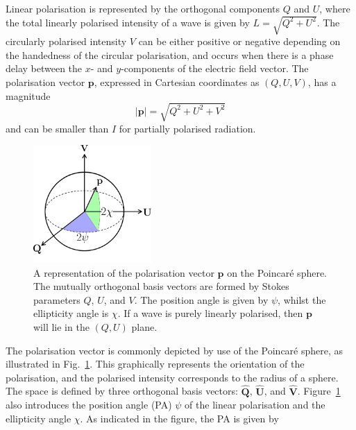 Linear polarisation is represented by the orthogonal components $Q$ and $U$, where the total linearly polarised intensity of a wave is given by $L = \sqrt{Q^2 + U^2}$. The circularly polarised intensity $V$ can be either positive or negative depending on the handedness of the circular polarisation, and occurs when there is a phase delay between the $x$- and $y$-components of the electric field vector. The polarisation vector $\mathbf{p}$, expressed in Cartesian coordinates as $(Q,U,V)$, has a magnitude
\begin{equation}
    \label{eq: polarisation vector magnitude}
    |\mathbf{p}| = \sqrt{Q^2 + U^2 + V^2}
\end{equation}
and can be smaller than $I$ for partially polarised radiation.

\begin{figure}
    \begin{center}
        \includegraphics[width=0.4\textwidth]{Figures/Introduction/poincare_sphere}
        \caption[Polarisation vector on the Poincar\'e sphere]{A representation of the polarisation vector $\mathbf{p}$ on the Poincar\'e sphere. The mutually orthogonal basis vectors are formed by Stokes parameters $Q$, $U$, and $V$. The position angle is given by $\psi$, whilst the ellipticity angle is $\chi$. If a wave is purely linearly polarised, then $\mathbf{p}$ will lie in the $(Q,U)$ plane.}
        \label{fig: intro - Poincare sphere}
    \end{center}
\end{figure}
The polarisation vector is commonly depicted by use of the Poincar\'e sphere, as illustrated in Fig.~\ref{fig: intro - Poincare sphere}. This graphically represents the orientation of the polarisation, and the polarised intensity corresponds to the radius of a sphere. The space is defined by three orthogonal basis vectors: $\hat{\mathbf{Q}}$, $\hat{\mathbf{U}}$, and $\hat{\mathbf{V}}$. Figure~\ref{fig: intro - Poincare sphere} also introduces the position angle (PA) $\psi$ of the linear polarisation and the ellipticity angle $\chi$. As indicated in the figure, the PA is given by
